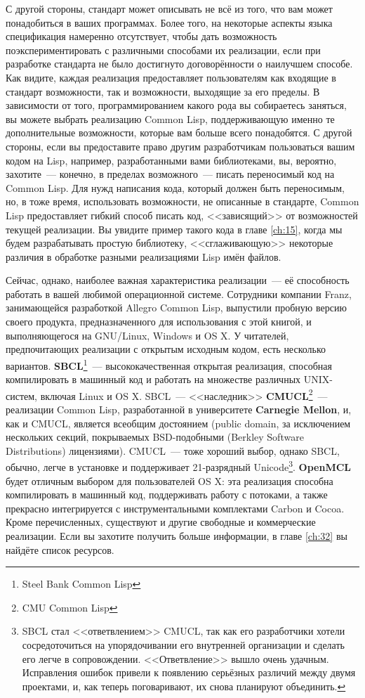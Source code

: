 С другой стороны, стандарт может описывать не всё из того, что вам может понадобиться в
ваших программах. Более того, на некоторые аспекты языка спецификация намеренно
отсутствует, чтобы дать возможность поэкспериментировать с различными способами их
реализации, если при разработке стандарта не было достигнуто договорённости о наилучшем
способе. Как видите, каждая реализация предоставляет пользователям как входящие в стандарт
возможности, так и возможности, выходящие за его пределы. В зависимости от того,
программированием какого рода вы собираетесь заняться, вы можете выбрать реализацию Common
Lisp, поддерживающую именно те дополнительные возможности, которые вам больше всего
понадобятся. С другой стороны, если вы предоставите право другим разработчикам
пользоваться вашим кодом на Lisp, например, разработанными вами библиотеками, вы,
вероятно, захотите~--- конечно, в пределах возможного~--- писать переносимый код на Common
Lisp. Для нужд написания кода, который должен быть переносимым, но, в тоже время,
использовать возможности, не описанные в стандарте, Common Lisp предоставляет гибкий
способ писать код, <<зависящий>> от возможностей текущей реализации. Вы увидите пример
такого кода в главе \ref{ch:15}, когда мы будем разрабатывать простую библиотеку, <<сглаживающую>>
некоторые различия в обработке разными реализациями Lisp имён файлов.

Сейчас, однако, наиболее важная характеристика реализации~--- её способность работать в
вашей любимой операционной системе. Сотрудники компании Franz, занимающейся разработкой
Allegro Common Lisp, выпустили пробную версию своего продукта, предназначенного для
использования с этой книгой, и выполняющегося на GNU/Linux, Windows и OS X. У читателей,
предпочитающих реализации с открытым исходным кодом, есть несколько
вариантов. \textbf{SBCL}\footnote{Steel Bank Common Lisp}~--- высококачественная открытая
реализация, способная компилировать в машинный код и работать на множестве различных
UNIX-систем, включая Linux и OS X. SBCL~--- <<наследник>> \textbf{CMUCL}\footnote{CMU Common
  Lisp}~--- реализации Common Lisp, разработанной в университете \textbf{Carnegie Mellon},
и, как и CMUCL, является всеобщим достоянием (public domain, за исключением нескольких
секций, покрываемых BSD-подобными (Berkley Software Distributions) лицензиями). CMUCL~---
тоже хороший выбор, однако SBCL, обычно, легче в установке и поддерживает 21-разрядный
Unicode\footnote{SBCL стал <<ответвлением>> CMUCL, так как его разработчики хотели
  сосредоточиться на упорядочивании его внутренней организации и сделать его легче в
  сопровождении. <<Ответвление>> вышло очень удачным. Исправления ошибок привели к появлению
  серьёзных различий между двумя проектами, и, как теперь поговаривают, их снова планируют
  объединить.}. \textbf{OpenMCL} будет отличным выбором для пользователей OS X: эта
реализация способна компилировать в машинный код, поддерживать работу с потоками, а также
прекрасно интегрируется с инструментальными комплектами Carbon и Cocoa. Кроме
перечисленных, существуют и другие свободные и коммерческие реализации. Если вы захотите
получить больше информации, в главе \ref{ch:32} вы найдёте список ресурсов.

